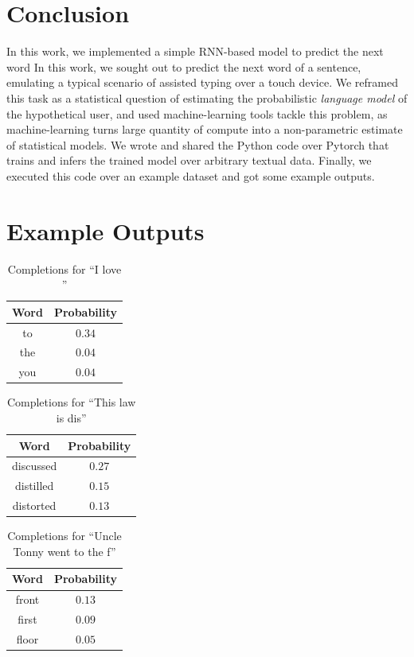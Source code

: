 \documentclass{article}
\theoremstyle{plain}
\theoremstyle{definition}
\theoremstyle{definition}
\theoremstyle{remark}
\begin{document}
\section{Conclusion}
In this work, we implemented a simple RNN-based model to predict the next word
In this work, we sought out to predict the next word of a sentence, emulating a typical scenario of assisted typing over a touch device. We reframed this task as a statistical question of estimating the probabilistic \emph{language model} of the hypothetical user, and used machine-learning tools tackle this problem, as machine-learning turns large quantity of compute into a non-parametric estimate of statistical models. We wrote and shared the Python code over Pytorch that
trains and infers the trained model over arbitrary textual data. Finally, we executed this code over an example dataset and got some example outputs.

\section{Example Outputs}
\FloatBarrier
\begin{table}[!ht]
    \centering
    \begin{tabular}{cc}
    \toprule
    Word & Probability \\
    \midrule
    to & \(0.34\) \\
    the & \(0.04\) \\
    you & \(0.04\) \\
    \bottomrule
    \end{tabular}
    \caption{Completions for ``I love ''}
\end{table}
\begin{table}[!ht]
    \centering
    \begin{tabular}{cc}
    \toprule
    Word & Probability \\
    \midrule
    discussed & \(0.27\) \\
    distilled & \(0.15\) \\
    distorted & \(0.13\) \\
    \bottomrule
    \end{tabular}
    \caption{Completions for ``This law is dis''}
\end{table}

\begin{table}[!ht]
    \centering
    \begin{tabular}{cc}
    \toprule
    Word & Probability \\
    \midrule
    front & \(0.13\) \\
    first & \(0.09\) \\
    floor & \(0.05\) \\
    \bottomrule
    \end{tabular}
    \caption{Completions for ``Uncle Tonny went to the f''}
\end{table}
\FloatBarrier

\printbibliography
\end{document}
